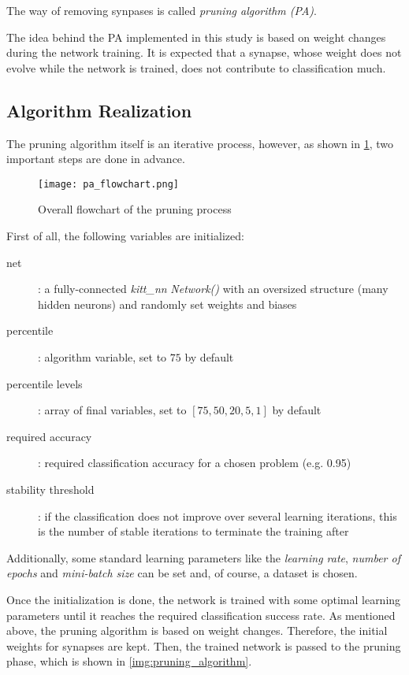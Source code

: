 The way of removing synpases is called \textit{pruning algorithm (PA)}.

The idea behind the PA implemented in this study is based on weight changes during the network training. It is expected that a synapse, whose weight does not evolve while the network is trained, does not contribute to classification much. 

\subsection{Algorithm Realization} \label{ssec:pa_realization}
The pruning algorithm itself is an iterative process, however, as shown in \cref{img:pa_flowchart}, two important steps are done in advance.

\begin{figure}[H]
  \centering
  \texttt{[image: pa\_flowchart.png]}
  \caption{Overall flowchart of the pruning process}
  \label{img:pa_flowchart}
\end{figure}

First of all, the following variables are initialized:

\begin{description}
\item[net] : a fully-connected \textit{kitt\_nn} \textit{Network()} with an oversized structure (many hidden neurons) and randomly set weights and biases
\item[percentile] : algorithm variable, set to $ 75 $ by default
\item[percentile levels] : array of final variables, set to $ [75, 50, 20, 5, 1] $ by default
\item[required accuracy] : required classification accuracy for a chosen problem (e.g. 0.95)
\item[stability threshold] : if the classification does not improve over several learning iterations, this is the number of stable iterations to terminate the training after
\end{description}

Additionally, some standard learning parameters like the \textit{learning rate}, \textit{number of epochs} and \textit{mini-batch size} can be set and, of course, a dataset is chosen.

Once the initialization is done, the network is trained with some optimal learning parameters until it reaches the required classification success rate. As mentioned above, the pruning algorithm is based on weight changes. Therefore, the initial weights for synapses are kept. Then, the trained network is passed to the pruning phase, which is shown in \cref{img:pruning_algorithm}.


